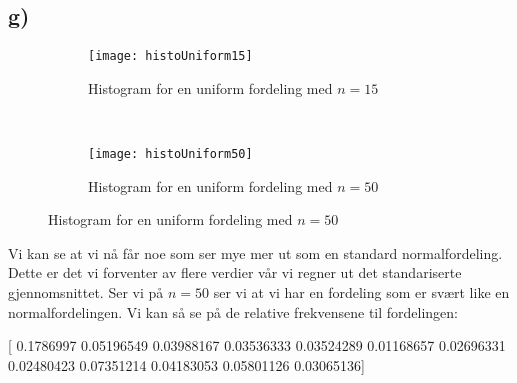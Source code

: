 \documentclass[a4paper,norsk, 10pt]{article}
\begin{document}
\subsection*{g)}

\begin{figure}[H]
\centering
	\begin{subfigure}[b]{0.4\textwidth}
        \texttt{[image: histoUniform15]}
        \caption{Histogram for en uniform fordeling med $n = 15$}
        \label{fig:HU15}
    \end{subfigure}
    ~
    \begin{subfigure}[b]{0.3\textwidth}
        \texttt{[image: histoUniform50]}
        \caption{Histogram for en uniform fordeling med $n = 50$}
        \label{fig:HU50}
    \end{subfigure}
\end{figure}

Vi kan se at vi nå får noe som ser mye mer ut som en standard normalfordeling. Dette er det vi forventer av flere verdier vår vi regner ut det standariserte gjennomsnittet. Ser vi på $n = 50$ ser vi at vi har en fordeling som er svært like en normalfordelingen. Vi kan så se på de relative frekvensene til fordelingen:

[ 0.1786997   0.05196549  0.03988167  0.03536333  0.03524289  0.01168657
  0.02696331  0.02480423  0.07351214  0.04183053  0.05801126  0.03065136]
\end{document}
